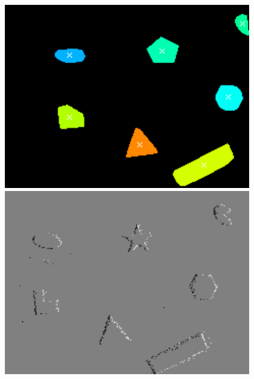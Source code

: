 \begin{figure}
\begin{minipage}{0.33\textwidth}
    \end{minipage}\hfill
    \begin{minipage}{0.33\textwidth}
        \centering
        \includegraphics[width = 0.95\textwidth]{images/obst_shapes1.png}
    \end{minipage}
        \begin{minipage}{0.33\textwidth}
        \centering
        \includegraphics[width = 0.95\textwidth]{images/unfiltered_shapes2.png}
    \end{minipage}\hfill
        \begin{minipage}{0.33\textwidth}
        \centering

\end{minipage}
\end{figure}
